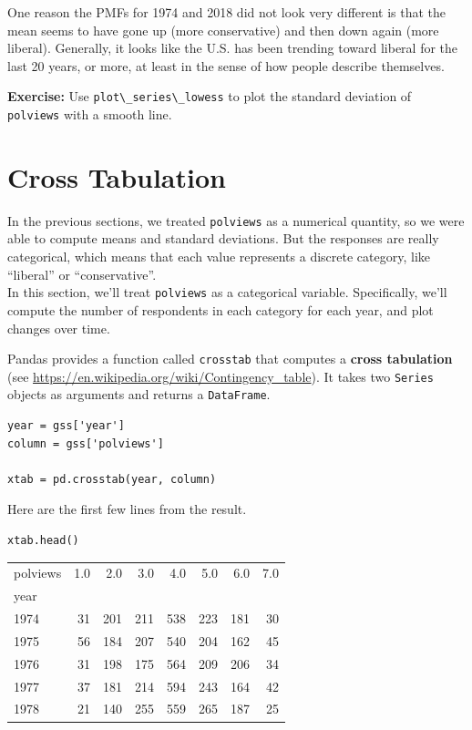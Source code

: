 One reason the PMFs for 1974 and 2018 did not look very different is
that the mean seems to have gone up (more conservative) and then down
again (more liberal). Generally, it looks like the U.S. has been
trending toward liberal for the last 20 years, or more, at least in the
sense of how people describe themselves.

\textbf{Exercise:} Use \passthrough{\lstinline!plot\_series\_lowess!} to
plot the standard deviation of \passthrough{\lstinline!polviews!} with a
smooth line.

\hypertarget{cross-tabulation}{%
\section{Cross Tabulation}\label{cross-tabulation}}

In the previous sections, we treated \passthrough{\lstinline!polviews!}
as a numerical quantity, so we were able to compute means and standard
deviations. But the responses are really categorical, which means that
each value represents a discrete category, like ``liberal'' or
``conservative''.\\
In this section, we'll treat \passthrough{\lstinline!polviews!} as a
categorical variable. Specifically, we'll compute the number of
respondents in each category for each year, and plot changes over time.

Pandas provides a function called \passthrough{\lstinline!crosstab!}
that computes a \textbf{cross tabulation} (see
\url{https://en.wikipedia.org/wiki/Contingency_table}). It takes two
\passthrough{\lstinline!Series!} objects as arguments and returns a
\passthrough{\lstinline!DataFrame!}.

\begin{lstlisting}[]
year = gss['year']
column = gss['polviews']

xtab = pd.crosstab(year, column)
\end{lstlisting}

Here are the first few lines from the result.

\begin{lstlisting}[]
xtab.head()
\end{lstlisting}

\begin{tabular}{lrrrrrrr}
\midrule
polviews &  1.0 &  2.0 &  3.0 &  4.0 &  5.0 &  6.0 &  7.0 \\
year &      &      &      &      &      &      &      \\
\midrule
1974 &   31 &  201 &  211 &  538 &  223 &  181 &   30 \\
1975 &   56 &  184 &  207 &  540 &  204 &  162 &   45 \\
1976 &   31 &  198 &  175 &  564 &  209 &  206 &   34 \\
1977 &   37 &  181 &  214 &  594 &  243 &  164 &   42 \\
1978 &   21 &  140 &  255 &  559 &  265 &  187 &   25 \\
\midrule
\end{tabular}

